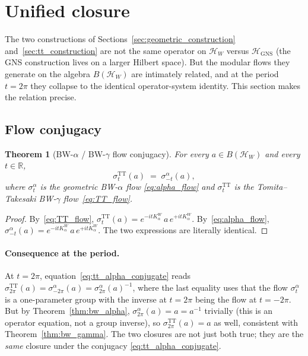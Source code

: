 \documentclass[11pt,a4paper]{article}
\theoremstyle{plain}
\newtheorem{theorem}{Theorem}[section]
\theoremstyle{definition}
\newcommand{\Hilb}{\mathcal{H}}
\newcommand{\R}{\mathbb{R}}
\newcommand{\TT}{\mathrm{TT}}
\newcommand{\GNS}{\mathrm{GNS}}
\begin{document}
\section{Unified closure}\label{sec:unified_closure}

The two constructions of Sections~\ref{sec:geometric_construction}
and~\ref{sec:tt_construction} are not the same operator on
$\Hilb_W$ versus $\Hilb_{\GNS}$ (the GNS construction lives on a
larger Hilbert space). But the modular flows they generate on the
algebra $B(\Hilb_W)$ are intimately related, and at the period
$t = 2\pi$ they collapse to the identical operator-system identity.
This section makes the relation precise.

\subsection{Flow conjugacy}\label{sec:flow_conjugacy}

\begin{theorem}[BW-$\alpha$ / BW-$\gamma$ flow conjugacy]
\label{thm:unified}
For every $a \in B(\Hilb_W)$ and every $t \in \R$,
\begin{equation}\label{eq:tt_alpha_conjugate}
   \sigma_t^{\TT}(a) \;=\; \sigma_{-t}^{\alpha}(a),
\end{equation}
where $\sigma_t^{\alpha}$ is the geometric BW-$\alpha$ flow
\eqref{eq:alpha_flow} and $\sigma_t^{\TT}$ is the Tomita--Takesaki
BW-$\gamma$ flow~\eqref{eq:TT_flow}.
\end{theorem}

\begin{proof}
By~\eqref{eq:TT_flow}, $\sigma_t^{\TT}(a) = e^{-it K_\alpha^W}\, a\,
e^{+it K_\alpha^W}$. By~\eqref{eq:alpha_flow}, $\sigma_{-t}^{\alpha}(a) =
e^{-it K_\alpha^W}\, a\, e^{+it K_\alpha^W}$. The two expressions are
literally identical.
\end{proof}

\paragraph{Consequence at the period.}
At $t = 2\pi$, equation~\eqref{eq:tt_alpha_conjugate} reads
$\sigma_{2\pi}^{\TT}(a) = \sigma_{-2\pi}^{\alpha}(a) =
\sigma_{2\pi}^{\alpha}(a)^{-1}$, where the last equality uses that the
flow $\sigma_t^{\alpha}$ is a one-parameter group with the inverse at
$t = 2\pi$ being the flow at $t = -2\pi$. But by
Theorem~\ref{thm:bw_alpha}, $\sigma_{2\pi}^{\alpha}(a) = a = a^{-1}$
trivially (this is an operator equation, not a group inverse), so
$\sigma_{2\pi}^{\TT}(a) = a$ as well, consistent with
Theorem~\ref{thm:bw_gamma}. The two closures are not just both true;
they are the \emph{same} closure under the conjugacy
\eqref{eq:tt_alpha_conjugate}.
\end{document}
